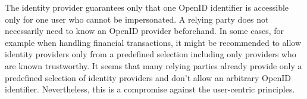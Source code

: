 \documentclass{tktltiki}
\begin{document}
      The identity provider guarantees only that one OpenID identifier is accessible only for one user who cannot be impersonated. A relying party does not necessarily need to know an OpenID provider beforehand. In some cases, for example when handling financial transactions, it might be recommended to allow identity providers only from a predefined selection including only providers who are known trustworthy. It seems that many relying parties already provide only a predefined selection of identity providers and don't allow an arbitrary OpenID identifier. Nevertheless, this is a compromise against the user-centric principles.
\end{document}
